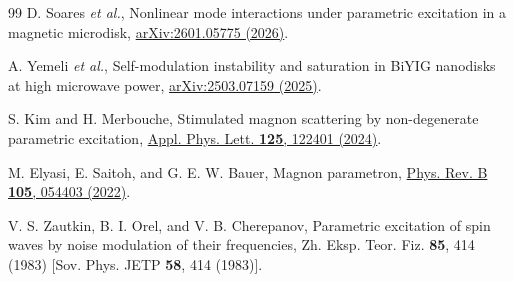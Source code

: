 \documentclass[aps,prb,reprint,superscriptaddress,floatfix]{revtex4-2}
\begin{document}
\begin{thebibliography}{99}
D. Soares \textit{et al.}, 
Nonlinear mode interactions under parametric excitation in a magnetic microdisk,
\href{https://arxiv.org/abs/2601.05775}{arXiv:2601.05775 (2026)}.

A. Yemeli \textit{et al.}, 
Self-modulation instability and saturation in BiYIG nanodisks at high microwave power,
\href{https://arxiv.org/abs/2503.07159}{arXiv:2503.07159 (2025)}.

S. Kim and H. Merbouche, 
Stimulated magnon scattering by non-degenerate parametric excitation,
\href{https://doi.org/10.1063/5.0223594}{Appl. Phys. Lett. \textbf{125}, 122401 (2024)}.

M. Elyasi, E. Saitoh, and G. E. W. Bauer, 
Magnon parametron,
\href{https://doi.org/10.1103/PhysRevB.105.054403}{Phys. Rev. B \textbf{105}, 054403 (2022)}.

V. S. Zautkin, B. I. Orel, and V. B. Cherepanov, 
Parametric excitation of spin waves by noise modulation of their frequencies,
Zh. Eksp. Teor. Fiz. \textbf{85}, 414 (1983) [Sov. Phys. JETP \textbf{58}, 414 (1983)].

\end{thebibliography}
\end{document}
